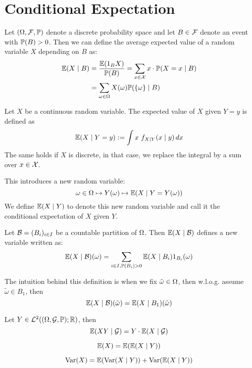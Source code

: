 \section{Conditional Expectation}
\begin{ddefinition*}
  Let \((\O, \F, \P)\) denote a discrete probability space and let \(B \in \F\) denote an event with \(\P(B) > 0\). Then we can define the average expected value of a random variable \(X\) depending on \(B\) as:
  \begin{align*}
    \E(X \mid B) &= \frac{\E(\I_B X)}{\P(B)} = \sum_{x \in \DX} x \cdot \P(X = x \mid B) \\
    &= \sum_{\omega \in \O} X(\omega) \P(\{\omega\} \mid B)
  \end{align*}
\end{ddefinition*}

\begin{cdefinition*}
  Let \(X\) be a continuous random variable. The expected value of \(X\) given \(Y = y\) is defined as
  \[\E(X \mid Y = y) := \int x \ f_{X \mid Y}(x \mid y) \,dx\]
  The same holds if \(X\) is discrete, in that case, we replace the integral by a sum over \(x \in \DX\).
\end{cdefinition*}

This introduces a new random variable:
\[\omega \in \O \mapsto Y(\omega) \mapsto \E(X \mid Y = Y(\omega))\]
We define \(\E(X \mid Y)\) to denote this new random variable and call it the conditional expectation of \(X\) given \(Y\).

\begin{ddefinition*}
  Let \(\B = (B_i)_{i \in I}\) be a countable partition of \(\O\). Then \(\E(X \mid \B)\) defines a new variable written as:
  \[\E(X \mid \B)(\omega) = \sum_{i \in I, \P(B_i) > 0} \E(X \mid B_i) \I_{B_i}(\omega)\]
\end{ddefinition*}

The intuition behind this definition is when we fix \(\tilde{\omega} \in \O\), then w.l.o.g. assume \(\tilde{\omega} \in B_1\), then
\[\E(X \mid \B)(\tilde{\omega}) = \E(X \mid B_1)(\tilde{\omega})\]

\begin{dtheorem*}
  Let \(Y \in \L^2((\O, \mathcal{G}, \P); \R)\), then
  \[\E(XY \mid \mathcal{G}) = Y \cdot \E(X \mid \mathcal{G})\]
\end{dtheorem*}

\begin{theorem*} \vspace{-5pt}
  \[\E(X) = \E(\E(X \mid Y))\]
\end{theorem*}

\begin{theorem*} \vspace{-5pt}
  \[\Var(X) = \E(\Var(X \mid Y)) + \Var(\E(X \mid Y))\]
\end{theorem*}
